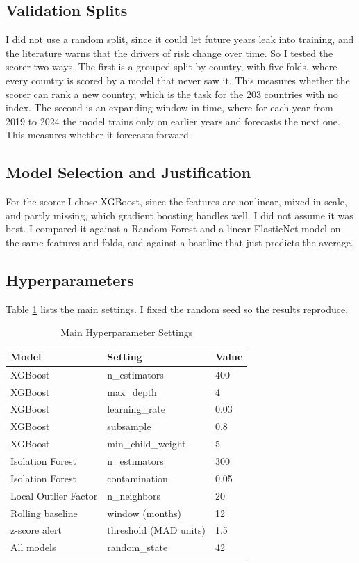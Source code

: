 \documentclass[stu,12pt,floatsintext]{apa7}
\begin{document}
\subsection{Validation Splits}
I did not use a random split, since it could let future years leak into training, and the literature warns that the drivers of risk change over time. So I tested the scorer two ways. The first is a grouped split by country, with five folds, where every country is scored by a model that never saw it. This measures whether the scorer can rank a new country, which is the task for the 203 countries with no index. The second is an expanding window in time, where for each year from 2019 to 2024 the model trains only on earlier years and forecasts the next one. This measures whether it forecasts forward.

\subsection{Model Selection and Justification}
For the scorer I chose XGBoost, since the features are nonlinear, mixed in scale, and partly missing, which gradient boosting handles well. I did not assume it was best. I compared it against a Random Forest and a linear ElasticNet model on the same features and folds, and against a baseline that just predicts the average.

\subsection{Hyperparameters}
Table \ref{tab:hyper} lists the main settings. I fixed the random seed so the results reproduce.

\begin{table}[H]
\caption{Main Hyperparameter Settings}
\label{tab:hyper}
\centering
\begin{tabular}{lll}
\toprule
\textbf{Model} & \textbf{Setting} & \textbf{Value} \\
\midrule
XGBoost & n\_estimators & 400 \\
XGBoost & max\_depth & 4 \\
XGBoost & learning\_rate & 0.03 \\
XGBoost & subsample & 0.8 \\
XGBoost & min\_child\_weight & 5 \\
Isolation Forest & n\_estimators & 300 \\
Isolation Forest & contamination & 0.05 \\
Local Outlier Factor & n\_neighbors & 20 \\
Rolling baseline & window (months) & 12 \\
z-score alert & threshold (MAD units) & 1.5 \\
All models & random\_state & 42 \\
\bottomrule
\end{tabular}
\end{table}
\end{document}
